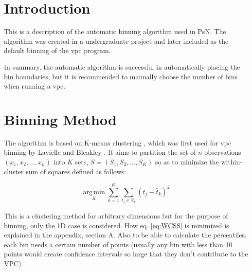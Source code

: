 

\usepackage{algorithm}
\usepackage{algorithmic}
\usepackage{graphicx}
\usepackage{epstopdf}
\usepackage{subfigure}
\usepackage[utf8]{inputenc}
\usepackage{amssymb,amsmath} 
\usepackage{color}
\usepackage{soul}
\usepackage[normalem]{ulem}
\newcommand{\hilight}[1]{\colorbox{yellow}{#1}}




\maketitle

\section{Introduction}
This is a description of the automatic binning algorithm used in PsN. The algorithm was created in a undergraduate project \cite{Sonehag} and later included as the default binning of the vpc program.

In summary, the automatic algorithm is successful in automatically placing the 
bin boundaries, but it is recommended to manually choose the number of bins
when running a vpc.

\section{Binning Method}
The algorithm is based on K-means clustering \cite{KMeans}, which was first used for vpc binning by Lavielle and Bleakley \cite{Lavielle}.
It aims to partition the set of $n$ observations $(x_1, x_2, ..., x_n)$ into $K$ sets, $S=(S_1, S_2, ..., S_K)$ so as to minimize the within-cluster sum of squares defined as follows: 

\begin{equation}
	  \underset{K}{\operatorname{arg\,min}} \sum_{k=1}^{K} \sum_{t_j \in S_k} (t_j - \bar{t}_k )^2.
	  \label{eq:WCSS} 
\end{equation}

This is a clustering method for arbitrary dimensions but for the purpose of binning, only the 1D case is considered. How eq. \ref{eq:WCSS} is minimized is explained in the appendix, section A. Also to be able to calculate the percentiles, each bin needs a certain number of points (usually any bin with less than 10 points would create confidence intervals so large that they don't contribute to the VPC).

